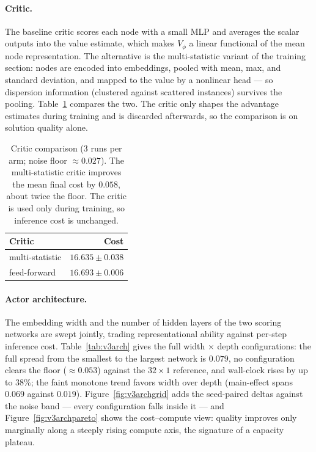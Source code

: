 \documentclass[letterpaper]{article} %
\begin{document}
\paragraph{Critic.}
The baseline critic scores each node with a small MLP and averages the scalar outputs into the value estimate, which makes $V_\phi$ a linear functional of the mean node representation. The alternative is the multi-statistic variant of the training section: nodes are encoded into embeddings, pooled with mean, max, and standard deviation, and mapped to the value by a nonlinear head --- so dispersion information (clustered against scattered instances) survives the pooling. Table~\ref{tab:v3critic} compares the two. The critic only shapes the advantage estimates during training and is discarded afterwards, so the comparison is on solution quality alone.

\begin{table}[t]
\centering
\small
\begin{tabular}{lr}
\toprule
\textbf{Critic} & \textbf{Cost} \\
\midrule
multi-statistic & $16.635 \pm 0.038$ \\
feed-forward    & $16.693 \pm 0.006$ \\
\bottomrule
\end{tabular}
\caption{Critic comparison ($3$ runs per arm; noise floor $\approx 0.027$). The multi-statistic critic improves the mean final cost by $0.058$, about twice the floor. The critic is used only during training, so inference cost is unchanged.}
\label{tab:v3critic}
\end{table}

\paragraph{Actor architecture.}
The embedding width and the number of hidden layers of the two scoring networks are swept jointly, trading representational ability against per-step inference cost. Table~\ref{tab:v3arch} gives the full width $\times$ depth configurations: the full spread from the smallest to the largest network is $0.079$, no configuration clears the floor ($\approx 0.053$) against the $32 \times 1$ reference, and wall-clock rises by up to $38\%$; the faint monotone trend favors width over depth (main-effect spans $0.069$ against $0.019$). Figure~\ref{fig:v3archgrid} adds the seed-paired deltas against the noise band --- every configuration falls inside it --- and Figure~\ref{fig:v3archpareto} shows the cost--compute view: quality improves only marginally along a steeply rising compute axis, the signature of a capacity plateau.
\end{document}
